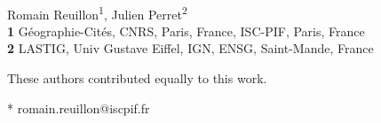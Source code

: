 \documentclass[10pt,letterpaper]{article}
\theoremstyle{definition}
\theoremstyle{remark}
\begin{document}
\vspace*{0.2in}

\begin{flushleft}
{\Large
  \textbf{} %
}
\newline
\\
Romain Reuillon\textsuperscript{1\Yinyang*},
Julien Perret\textsuperscript{2\Yinyang}
\\
\bigskip
\textbf{1} Géographie-Cités, CNRS, Paris, France, ISC-PIF, Paris, France
\\
\textbf{2} LASTIG, Univ Gustave Eiffel, IGN, ENSG, Saint-Mande, France
\\
\bigskip

% 
%
\Yinyang These authors contributed equally to this work.





* romain.reuillon@iscpif.fr

\end{flushleft}
\end{document}

